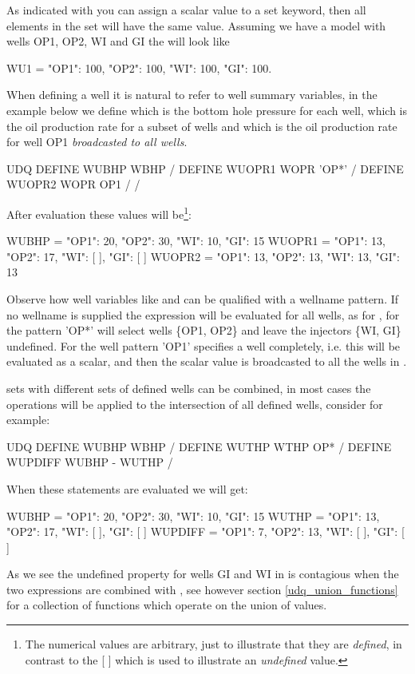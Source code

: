 As indicated with  you can assign a scalar value to a set
keyword, then all elements in the set will have the same value. Assuming we have
a model with wells OP1, OP2, WI and GI the  will look like
\begin{code}
  WU1 = {"OP1": 100, "OP2": 100, "WI": 100, "GI": 100}.
\end{code}
When defining a well \udq{} it is natural to refer to well summary variables, in
the example below we define  which is the bottom hole pressure
for each well,  which is the oil production rate for a subset of
wells and  which is the oil production rate for well OP1 \emph{broadcasted to all wells}.
\begin{deck}
UDQ
  DEFINE WUBHP  WBHP     / 
  DEFINE WUOPR1 WOPR 'OP*' /
  DEFINE WUOPR2 WOPR OP1 /
/
\end{deck}
After evaluation these \udq{} values will be\footnote{The numerical values are
arbitrary, just to illustrate that they are \emph{defined}, in contrast to the
[ ] which is used to illustrate an \emph{undefined} value.}:
\begin{code}
  WUBHP  = {"OP1": 20, "OP2": 30, "WI": 10,  "GI": 15}
  WUOPR1 = {"OP1": 13, "OP2": 17, "WI": [ ], "GI": [ ]}
  WUOPR2 = {"OP1": 13, "OP2": 13, "WI": 13,  "GI": 13}
\end{code}
Observe how well variables like  and  can be qualified with a
wellname pattern. If no wellname is supplied the expression will be evaluated
for all wells, as for , for  the pattern 'OP*' will select
wells \{OP1, OP2\} and leave the injectors \{WI, GI\} undefined. For 
the well pattern 'OP1' specifies a well completely, i.e. this will be evaluated
as a scalar, and then the scalar value  is
broadcasted to all the wells in .

\udq{} sets with different sets of defined wells can be combined, in most cases
the operations will be applied to the intersection of all defined wells,
consider for example\label{udq_diff}:

\begin{deck}
UDQ
  DEFINE WUBHP    WBHP /
  DEFINE WUTHP    WTHP OP* /
  DEFINE WUPDIFF  WUBHP - WUTHP
/
\end{deck}
When these \udq{} statements are evaluated we will get:
\begin{code}
  WUBHP   = {"OP1": 20, "OP2": 30, "WI": 10,  "GI": 15}
  WUTHP   = {"OP1": 13, "OP2": 17, "WI": [ ], "GI": [ ]}
  WUPDIFF = {"OP1":  7, "OP2": 13, "WI": [ ], "GI": [ ]}
\end{code}
As we see the undefined property for wells GI and WI in  is contagious
when the two expressions are combined with ,
see however section \ref{udq_union_functions} for a collection of functions
which operate on the union of values.

